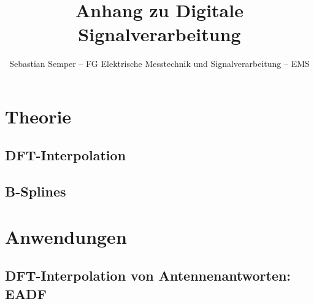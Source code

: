 \documentclass[ngerman]{article}
\title{Anhang zu Digitale Signalverarbeitung}
\author{Sebastian Semper -- FG Elektrische Messtechnik und Signalverarbeitung -- EMS}
\begin{document}

%
%
\section{Theorie}
%
%
\subsection{DFT-Interpolation}\label{dftintp}
%

%
%
\subsection{B-Splines}\label{bsplines}
%

%
%
\section{Anwendungen}
%
%
\subsection{DFT-Interpolation von Antennenantworten: EADF}\label{eadf}
%

%
%
%

\end{document}

